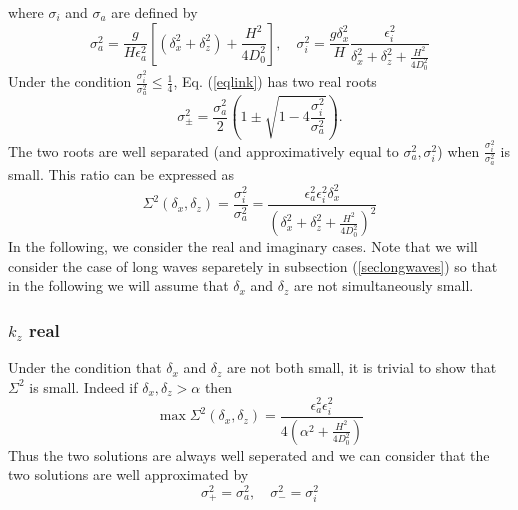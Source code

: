 where $\sigma_i$ and $\sigma_a$ are defined by
\[
\sigma_a^2=\frac{g}{H\epsilon_a^2}\left[
\left(\delta_x^2+\delta_z^2\right)
+\frac{H^2}{4D_0^2}
\right],
\quad
\sigma_i^2=
\frac{g \delta_x^2}{H}\frac{\epsilon_i^2}{\delta_x^2+\delta_z^2+\frac{H^2}{4D_0^2}}
\]
Under the condition $\displaystyle \frac{\sigma_i^2}{\sigma_a^2}\le \frac{1}{4}$, Eq. (\ref{eqlink}) has two real roots
\[
\sigma_{\pm}^2
=\frac{\sigma_a^2}{2}
\left(
1\pm
\sqrt{1-4\frac{\sigma_i^2}{\sigma_a^2}}
\right).
\]
The two roots are well separated (and approximatively equal to $\sigma_a^2, \sigma_i^2$) when $\displaystyle \frac{\sigma_i^2}{\sigma_a^2}$ is small. This ratio can be expressed as
\begin{equation}
\Sigma^2(\delta_x,\delta_z)=\frac{\sigma_i^2}{\sigma_a^2}=\frac{\epsilon_a^2\epsilon_i^2\delta_x^2}{\left(\delta_x^2+\delta_z^2+\frac{H^2}{4D_0^2}
\right)^2}
\label{eqratio}
\end{equation}
In the following, we consider the real and imaginary cases. Note that we will consider the case of long waves separetely in subsection (\ref{seclongwaves}) so that in the following we will assume that $\delta_x$ and $\delta_z$ are not simultaneously small.
\subsubsection{$k_z$ real}
Under the condition that $\delta_x$ and $\delta_z$ are not both small, it is trivial to show that $\Sigma^2$ is small. Indeed if $\delta_x, \delta_z > \alpha$ then
\[
\max \Sigma^2(\delta_x,\delta_z)=\frac{\epsilon_a^2\epsilon_i^2}{4\left(\alpha^2+\frac{H^2}{4D_0^2}\right)}
\]
Thus the two solutions are always well seperated and we can consider that the two solutions are well approximated by
\[
\sigma_+^2=\sigma_a^2,\quad \sigma_-^2=\sigma_i^2
\]
